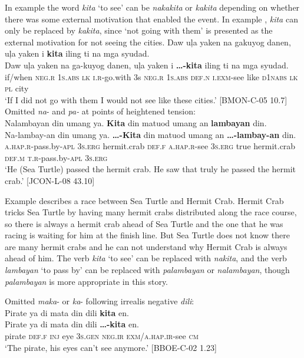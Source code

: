 In example  the word \textit{kita} ‘to see’ can be \textit{nakakita} or \textit{kakita} depending on whether there was some external motivation that enabled the event. In example , \textit{kita} can only be replaced by \textit{kakita}, since ‘not going with them’ is presented as the external motivation for not seeing the cities.
\ea
\label{syudad}
Daw  uļa  yaken  na  gakuyog  danen,  uļa  yaken  i  \textbf{kita} iling  ti  na  mga  syudad. \\\smallskip
 \gll Daw  uļa  yaken  na  ga-kuyog  danen,  uļa  yaken  i  \textbf{…-kita} iling  ti  na  mga  syudad. \\
if/when  \textsc{neg.r}  1\textsc{s.abs}  \textsc{lk}  \textsc{i.r}-go.with  3s  \textsc{neg.r}  1\textsc{s.abs}  \textsc{def.n}  \textsc{i.exm}-see
like  \textsc{d}1\textsc{nabs}  \textsc{lk}  \textsc{pl}  city \\
\glt `If I did not go with them I would not see like these cities.’ [BMON-C-05 10.7]
\z
\ea
\label{ex:hermitcrabvs}
Omitted \textit{na}{}- and \textit{pa-} at points of heightened tension: \\
Nalambayan  din  umang  ya.  \textbf{Kita}  din  matuod umang  an  \textbf{lambayan}  din. \\\smallskip
 \gll Na-lambay-an  din  umang  ya.  \textbf{…-Kita}  din  matuod umang  an  \textbf{…-lambay-an}  din. \\
\textsc{a.hap.}\textsc{r}-pass.by-\textsc{apl}  3\textsc{s.erg}  hermit.crab  \textsc{def.f}  \textsc{a.hap.}\textsc{r}-see  3\textsc{s.erg}  true
hermit.crab  \textsc{def.m}  \textsc{t.r}-pass.by-\textsc{apl}  3\textsc{s.erg} \\
\glt `He (Sea Turtle) passed the hermit crab. He saw that truly he passed the hermit crab.’ [JCON-L-08 43.10]
\z

Example  describes a race between Sea Turtle and Hermit Crab. Hermit Crab tricks Sea Turtle by having many hermit crabs distributed along the race course, so there is always a hermit crab ahead of Sea Turtle and the one that he was racing is waiting for him at the finish line. But Sea Turtle does not know there are many hermit crabs and he can not understand why Hermit Crab is always ahead of him. The verb \textit{kita} ‘to see’ can be replaced with \textit{nakita}, and the verb \textit{lambayan} ‘to pass by’ can be replaced with \textit{palambayan} or \textit{nalambayan}, though \textit{palambayan} is more appropriate in this story.

\ea
\label{ex:pirates}
Omitted \textit{maka}{}- or \textit{ka}{}- following irrealis negative \textit{dili}: \\
Pirate  ya  di  mata  din  dili  \textbf{kita}  en. \\\smallskip
 \gll Pirate  ya  di  mata  din  dili  \textbf{…-kita}  en. \\
pirate  \textsc{def.f}  \textsc{inj}  eye  3\textsc{s.gen}  \textsc{neg.ir}  \textsc{exm/a.hap.ir}-see  \textsc{cm} \\
\glt ‘The pirate, his eyes can’t see anymore.’ [BBOE-C-02 1.23]
\z

